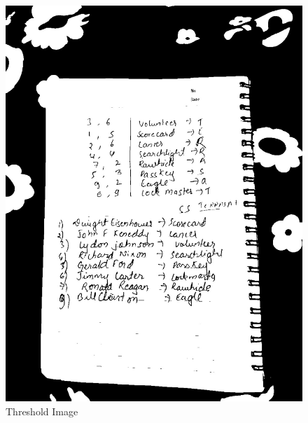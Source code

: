 \begin{enumerate}
\begin{figure}[h]
\begin{minipage}[b]{0.30\linewidth}
            \includegraphics[width=\linewidth]{output/thresholded.jpg}
            \caption{Threshold Image}
        \end{minipage}
        

\end{figure}
\end{enumerate}
